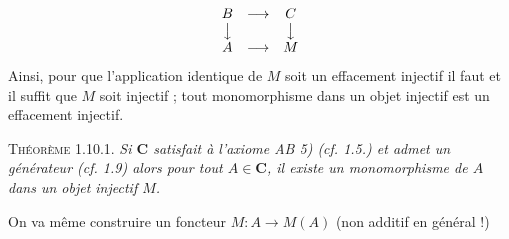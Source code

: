 \[
\begin{array}{ccc}
B & \longrightarrow & C \\
\big\downarrow && \big\downarrow \\
A & \longrightarrow & M
\end{array}
\]
Ainsi, pour que l'application identique de $M$ soit un effacement injectif il
faut et il suffit que $M$ soit injectif ; tout monomorphisme dans un objet
injectif est un effacement injectif.

\textsc{Théorème 1.10.1.} \textit{Si $\mathbf{C}$ satisfait à l'axiome
\textup{AB 5) (}\textit{cf.} \textup{1.5.)} et admet un générateur \textup{(}\textit{cf.} \textup{1.9)} alors pour tout $A\in \mathbf{C}$, il
existe un monomorphisme de $A$ dans un objet injectif $M$.}

On va même construire un foncteur
$M:A\to M(A)$ (non additif en général !)


